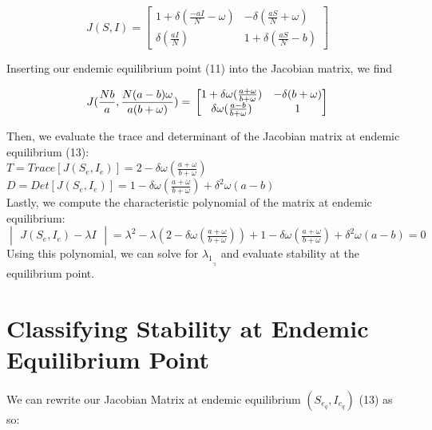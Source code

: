 \documentclass[%
 reprint,
]{revtex4-2}
\begin{document}
\begin{equation}
J(S,I) = 
\begin{bmatrix}
1+\delta(\frac{-aI}{N}-\omega)  &   -\delta(\frac{aS}{N}+\omega)\\
\delta(\frac{aI}{N})    &   1+\delta(\frac{aS}{N}-b) 
\end{bmatrix}
\end{equation}

Inserting our endemic equilibrium point (11) into the Jacobian matrix, we find

\begin{equation}
J(\frac{Nb}{a},\frac{N(a-b)\omega}{a(b+\omega)}) = \\ \begin{bmatrix} 
1+\delta\omega(\frac{a+\omega}{b+\omega}) & -\delta(b+\omega) \\
\delta\omega(\frac{a-b}{b+\omega}) & 1 \end{bmatrix}
\end{equation}

Then, we evaluate the trace and determinant of the Jacobian matrix at endemic equilibrium (13): \\

$T=Trace[J(S_e,I_e)]=2-\delta\omega(\frac{a+\omega}{b+\omega})$ \\
$D=Det[J(S_e,I_e)]=1-\delta\omega(\frac{a+\omega}{b+\omega}) + \delta^2\omega(a-b)$\\

Lastly, we compute the characteristic polynomial of the matrix at endemic equilibrium: \\

$\begin{vmatrix} J(S_e,I_e)-\lambda I\end{vmatrix} = \lambda^2 - \lambda(2-\delta\omega(\frac{a+\omega}{b+\omega}))+1-\delta\omega(\frac{a+\omega}{b+\omega}) + \delta^2\omega(a-b)=0$ \\

Using this polynomial, we can solve for $\lambda_1_,_2$ and evaluate stability at the equilibrium point.


\section{\label{sec:level1}Classifying Stability at Endemic Equilibrium Point \protect\\}

We can rewrite our Jacobian Matrix at endemic equilibrium $(S_e_q,I_e_q)$ (13) as so: \\
\end{document}
